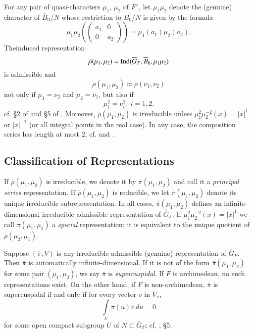 For any pair of quasi-characters $\mu_{1}$, $\mu_{2}$ of $F^{x}$, let $\mu_{1}\mu_{2}$ denote the (genuine) character of $\overline{B}_{0}/N$ whose restriction to $B_{0}/N$ is given by the formula
$$
\mu_{1}\mu_{2}\left(\left(\begin{matrix} a_{1} & 0\\ 0 & a_{2}\end{matrix}\right)\right)=\mu_{1}(a_{1})\mu_{2}(a_{2}).
$$
The\pageoriginale induced representation
\setcounter{equation}{0}
\begin{equation}
\overline{\rho}(\mu_{1},\mu_{2})=\operatorname{Ind} (\overline{G}_{F},\overline{B}_{0},\mu_{1}\mu_{2})\label{art1-eq2.3.1}
\end{equation}
is admissible and
$$
\overline{\rho}(\mu_{1},\mu_{2})\approx \overline{\rho}(\nu_{1},\nu_{2})
$$
not only if $\mu_{1}=\nu_{2}$ and $\mu_{2}=\nu_{1}$, but also if
\begin{equation}
\mu^{2}_{i}=\nu^{2}_{i}, \ i=1,2.\label{art1-eq2.3.2}
\end{equation}
cf. \S2 of \cite{GePS2} and \S5 of \cite{Ge}. Moreover, $\overline{\rho}(\mu_{1},\mu_{2})$ is irreducible unless $\mu^{2}_{1}\mu^{-2}_{2}(x)=|x|^{1}$ or $|x|^{-1}$ (or all integral points in the real case). In any case, the composition series has length at most 2; cf. \cite{Moen} and \cite{GeSa}.

\subsection{Classification of Representations}\label{art1-sec2.4}
If $\overline{\rho}(\mu_{1},\mu_{2})$ is irreducible, we denote it by $\overline{\pi}(\mu_{1},\mu_{2})$ and call it a {\em principal series} representation. If $\overline{\rho}(\mu_{1},\mu_{2})$ is reducible, we let $\overline{\pi}(\mu_{1},\mu_{2})$ denote its unique irreducible subrepresentation. In all cases, $\overline{\pi}(\mu_{1},\mu_{2})$ defines an infinite-dimensional irreducible admissible representation of $\overline{G}_{F}$. If $\mu^{2}_{1}\mu^{-2}_{2}(x)=|x|^{1}$ we call $\overline{\pi}(\mu_{1},\mu_{2})$ a {\em special} representation; it is equivalent to the unique quotient of $\overline{\rho}(\mu_{2},\mu_{1})$.

Suppose $(\overline{\pi},V)$ is any irreducible admissible (genuine) representation of $\overline{G}_{F}$. Then $\overline{\pi}$ is automatically infinite-dimensional. If it is not of the form $\overline{\pi}(\mu_{1},\mu_{2})$ for some pair $(\mu_{1},\mu_{2})$, we say $\overline{\pi}$ is {\em supercuspidal}. If $F$ is archimedean, no such representations exist. On the other hand, if $F$ is non-archimedean, $\overline{\pi}$ is supercuspidal if and only if for every vector $v$ in $V_{\overline{\pi}}$,
$$
\int\limits_{U}\overline{\pi}(u)v\ du = 0
$$
for some open compact subgroup $U$ of $N\subset \overline{G}_{F}$; cf. \cite{Ge}, \S5.


